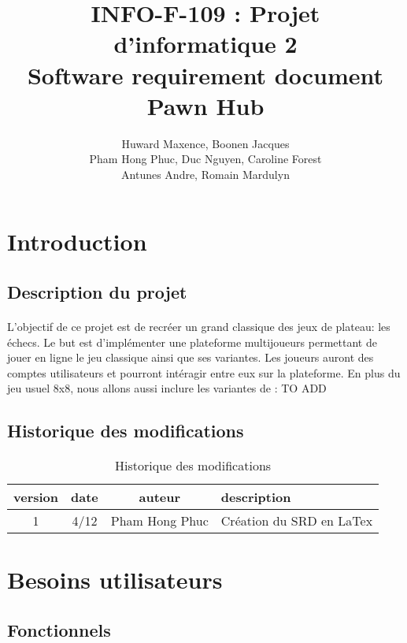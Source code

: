 \documentclass[10pt, a4paper]{article}
\title{INFO-F-109 : Projet d'informatique 2 \\
       \textbf{Software requirement document\\
	   Pawn Hub}}
\author{Huward Maxence, Boonen Jacques\\
		Pham Hong Phuc, Duc Nguyen, Caroline Forest\\
		Antunes Andre, Romain Mardulyn}
\date{}
\begin{document}
	\maketitle
	\tableofcontents %
	\newpage
	\section{Introduction}
		\subsection{Description du projet}
			\paragraph{}L'objectif de ce projet est de recréer un grand classique des jeux de plateau: les échecs. Le but est d'implémenter une plateforme multijoueurs permettant de jouer en ligne le jeu classique ainsi que ses variantes.
Les joueurs auront des comptes utilisateurs et pourront intéragir entre eux sur la plateforme.
En plus du jeu usuel 8x8, nous allons aussi inclure les variantes de : TO ADD

		\subsection{Historique des modifications}
		
		\begin{table}[h!]
			\centering
			\begin{tabular}{|c|c|c|p{50mm}|}
				\hline
				 \textbf{version} & \textbf{date} & \textbf{auteur}  & \textbf{description} \\ \hline
				 1 & 4/12 & Pham Hong Phuc & Création du SRD en LaTex\\ \hline

\end{tabular}
			\caption*{Historique des modifications}
			\end{table}


	\section{Besoins utilisateurs}
		\subsection{Fonctionnels}
		
\end{document}
